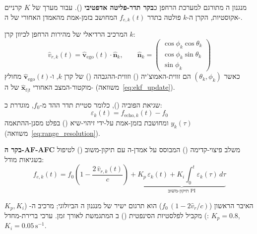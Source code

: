 מנגנון ה מתורגם למערכת הרחפן כ\textbf{בקר תדר-פליטה אדפטיבי}
().
עבור מערך של $K$ קרניים אקוסטיות, הקרן ה-$k$ פולטה בתדר $f_{e,k}(t)$
המחושב בזמן-אמת מהאמדן האחורי של ה-.

המרכיב הרדיאלי של מהירות הרחפן לכיוון קרן $k$:
\begin{equation}
    \hat{v}_{r,k}(t)
    = \hat{\mathbf{v}}_{\mathrm{ego}}(t)\cdot\hat{\mathbf{n}}_k,
    \qquad
    \hat{\mathbf{n}}_k = \begin{pmatrix}
        \cos\phi_k\cos\theta_k\\
        \cos\phi_k\sin\theta_k\\
        \sin\phi_k
    \end{pmatrix}
    \label{eq:radial_vel}
\end{equation}
כאשר $(\theta_k, \phi_k)$ הם זווית-האמוצ'יה ()
וזווית-ההגבהה () של קרן $k$,
ו-$\hat{\mathbf{v}}_{\mathrm{ego}}(t)$ מחולץ מוקטור-המצב האחורי
$\hat{\mathbf{x}}_{t|t}$ של ה- (משוואה~\ref{eq:ekf_update}).

שגיאת הפוביה (), כלומר סטיית תדר ההד מ-$f_0$,
מוגדרת כ:
\begin{equation}
    \varepsilon_k(t) = f_{\mathrm{echo},k}(t) - f_0
    \label{eq:foveal_error}
\end{equation}
ומחושבת בזמן-אמת על-ידי זיהוי-שיא ()
בפלט מסנן-ההתאמה $y_k(\tau)$ (משוואה~\ref{eq:range_resolution}).

\textbf{בקר ה-AF-AFC} משלב פיצוי-קדימה ()
המבוסס על אמדן-ה עם תיקון-משוב () לטיפול
בשגיאות מודל:
\begin{equation}
    \boxed{
    f_{e,k}(t)
    = f_0\!\left(1 - \frac{2\,\hat{v}_{r,k}(t)}{c}\right)
    + \underbrace{K_p\,\varepsilon_k(t)
    + K_i\!\int_0^t \varepsilon_k(\tau)\,d\tau}_{\text{תיקון-משוב PI}}
    }
    \label{eq:afafc}
\end{equation}

האיבר הראשון ($f_0\,(1-2\hat{v}_r/c)$) הוא תרגום ישיר של מנגנון
ה הביולוגי; מרכיב ה- ($K_p, K_i$) מקביל לפלסטיות
הסינפטית () ב
המתגמשת לאורך זמן. ערכי ברירת-מחדל: $K_p = 0.8$, $K_i = 0.05\,\text{s}^{-1}$.

